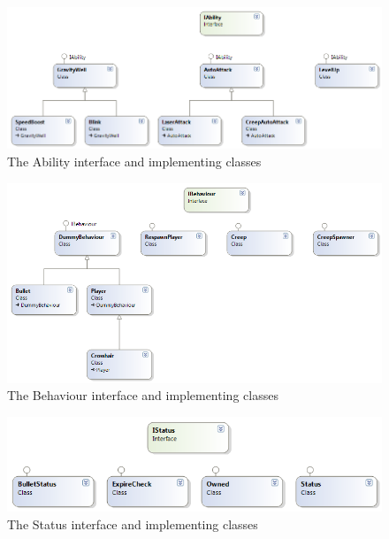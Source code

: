 \begin{figure}
    \begin{center}
    \includegraphics[width=\linewidth]{graphics/abilities}
    \caption{The Ability interface and implementing classes}
    \label{fig:abilities}
    \end{center}
\end{figure}

\begin{figure}
    \begin{center}
    \includegraphics[width=\linewidth]{graphics/behaviours}
    \caption{The Behaviour interface and implementing classes}
    \label{fig:behaviours}
    \end{center}
\end{figure}

\begin{figure}
    \begin{center}
    \includegraphics[width=\linewidth]{graphics/statuses}
    \caption{The Status interface and implementing classes}
    \label{fig:statuses}
    \end{center}
\end{figure}

